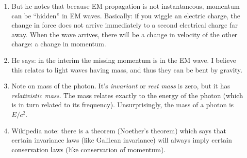 \begin{enumerate}
  \item But he notes that because EM propagation is not instantaneous,
  momentum can be ``hidden'' in EM waves. Basically: if you wiggle an
  electric charge, the change in force does not arrive immediately to a
  second electrical charge far away. When the wave arrives, there will
  be a change in velocity of the other charge: a change in momentum.

  \item He says: in the interim the missing momentum is in the EM wave.
  I believe this relates to light waves having mass, and thus they can
  be bent by gravity.

  \item Note on mass of the photon. It's \emph{invariant} or \emph{rest
  mass} is zero, but it has \emph{relativistic mass}. The mass relates
  exactly to the energy of the photon (which is in turn related to its
  frequency). Unsurprisingly, the mass of a photon is $E/c^2$.

  \item Wikipedia note: there is a theorem (Noether's theorem) which
  says that certain invariance laws (like Galilean invariance) will
  always imply certain conservation laws (like conservation of
  momentum).

\end{enumerate}
